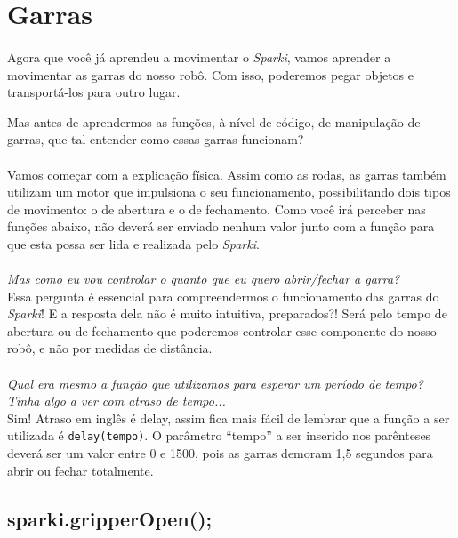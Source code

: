 \section{Garras}
\paragraph{}
Agora que você já aprendeu a movimentar o \textsl{Sparki}, vamos aprender a movimentar as garras do nosso robô. 
Com isso, poderemos pegar objetos e transportá-los para outro lugar.

Mas antes de aprendermos as funções, à nível de código, de manipulação de garras, que tal entender como essas garras funcionam?
\paragraph{}
Vamos começar com a explicação física. Assim como as rodas, as garras também utilizam um motor que impulsiona o seu funcionamento, possibilitando dois tipos de movimento: o de abertura e o de fechamento. Como você irá perceber nas funções abaixo, não deverá ser enviado nenhum valor junto com a função para que esta possa ser lida e realizada pelo \textsl{Sparki}. 
\\~\\
\textit{Mas como eu vou controlar o quanto que eu quero abrir/fechar a garra?} \\
Essa pergunta é essencial para compreendermos o funcionamento das garras do \textsl{Sparki}! E a resposta dela não é muito intuitiva, preparados?! Será pelo tempo de abertura ou de fechamento que poderemos controlar esse componente do nosso robô, e não por medidas de distância.
\\~\\
\textit{Qual era mesmo a função que utilizamos para esperar um período de tempo? Tinha algo a ver com atraso de tempo...} \\
Sim! Atraso em inglês é delay, assim fica mais fácil de lembrar que a função a ser utilizada é \texttt{delay(tempo)}. O parâmetro ``tempo'' a ser inserido nos parênteses deverá ser um valor entre 0 e 1500, pois as garras demoram 1,5 segundos para abrir ou fechar totalmente.

\subsection{sparki.gripperOpen();}

